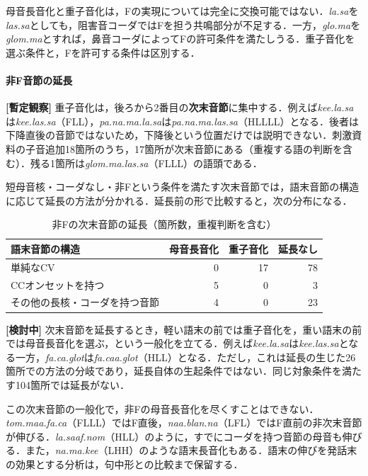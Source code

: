 \documentclass[../../main-detail.tex]{subfiles}
\begin{document}
\begin{remark}
母音長音化と重子音化は，Fの実現については完全に交換可能ではない．\textit{la.sa}を\textit{las.sa}としても，阻害音コーダではFを担う共鳴部分が不足する．一方，\textit{glo.ma}を\textit{glom.ma}とすれば，鼻音コーダによってFの許可条件を満たしうる．重子音化を選ぶ条件と，Fを許可する条件は区別する．
\end{remark}

\paragraph{非F音節の延長}
\textbf{[暫定観察]} 重子音化は，後ろから2番目の\textbf{次末音節}に集中する．例えば\textit{kee.la.sa}は\textit{kee.las.sa}（FLL），\textit{pa.na.ma.la.sa}は\textit{pa.na.ma.las.sa}（HLLLL）となる．後者は下降直後の音節ではないため，下降後という位置だけでは説明できない．刺激資料の子音追加18箇所のうち，17箇所が次末音節にある（重複する語の判断を含む）．残る1箇所は\textit{glom.ma.las.sa}（FLLL）の語頭である．

短母音核・コーダなし・非Fという条件を満たす次末音節では，語末音節の構造に応じて延長の方法が分かれる．延長前の形で比較すると，次の分布になる．
\begin{table}[H]
  \centering
  \caption{非Fの次末音節の延長（箇所数，重複判断を含む）}
  \begin{tabular}{lrrr}
    \toprule
    語末音節の構造 & 母音長音化 & 重子音化 & 延長なし\\
    \midrule
    単純なCV & 0 & 17 & 78\\
    CCオンセットを持つ & 5 & 0 & 3\\
    その他の長核・コーダを持つ音節 & 4 & 0 & 23\\
    \bottomrule
  \end{tabular}
\end{table}
\textbf{[検討中]} 次末音節を延長するとき，軽い語末の前では重子音化を，重い語末の前では母音長音化を選ぶ，という一般化を立てる．例えば\textit{kee.la.sa}は\textit{kee.las.sa}となる一方，\textit{fa.ca.glot}は\textit{fa.caa.glot}（HLL）となる．ただし，これは延長の生じた26箇所での方法の分岐であり，延長自体の生起条件ではない．同じ対象条件を満たす104箇所では延長がない．

この次末音節の一般化で，非Fの母音長音化を尽くすことはできない．\textit{tom.maa.fa.ca}（FLLL）ではF直後，\textit{naa.blan.na}（LFL）ではF直前の非次末音節が伸びる．\textit{la.saaf.nom}（HLL）のように，すでにコーダを持つ音節の母音も伸びる．また，\textit{na.ma.kee}（LHH）のような語末長音化もある．語末の伸びを発話末の効果とする分析は，句中形との比較まで保留する．
\end{document}
